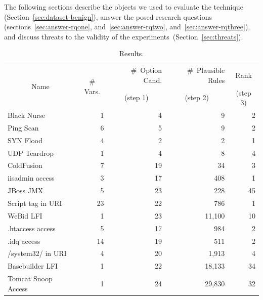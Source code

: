 \documentclass[sigconf,review, anonymous]{acmart}
\begin{document}
The following sections describe the objects we used to evaluate the
technique (Section~\ref{sec:dataset-benign}), answer the posed
research questions (sections~\ref{sec:answer-rqone},
and~\ref{sec:answer-rqtwo}, and~\ref{sec:answer-rqthree}), and
discuss threats to the validity of the
experiments~(Section~\ref{sec:threats}).

\renewcommand{\arraystretch}{0.9}
\setlength{\tabcolsep}{2pt}
\begin{table}[h!]
  \small
  \caption{\label{table:results}Results.}
  \vspace{-2ex}
  \centering
  \begin{tabular}{lrrrr}
    \toprule
    \multicolumn{1}{c}{\multirow{2}{*}{Name}} &
    \multicolumn{1}{c}{\multirow{2}{*}{\# Vars.}} &
    \#~Option Cand. &
    \#~Plausible Rules &    
    \multicolumn{1}{c}{Rank} \\

     &
    \multicolumn{1}{c}{} &
    \multicolumn{1}{c}{(step 1)} &
    \multicolumn{1}{c}{(step 2)} &    
    \multicolumn{1}{c}{(step 3)} \\

    \midrule
    Black Nurse & 1 & 4 & 9 & 2 \\    
    Ping Scan & 6 & 5 & 9 & 2 \\
    SYN Flood & 4 & 2 & 2 & 1 \\
    UDP Teardrop & 1 & 4 & 8 & 4 \\
    \midrule
    ColdFusion & 7 & 19 & 34 & 3\\
    iisadmin access & 3 & 17 & 408 & 1 \\        
    JBoss JMX & 5 & 23 & 228 & 45 \\
    Script tag in URI & 23 & 22 & 786 & 1 \\
    WeBid LFI & 1 & 23 & 11,100 & 10\\    
    .htaccess access & 5 & 17 & 984 & 2\\
    .idq access & 14 & 19 & 511 & 2 \\
    /system32/ in URI & 4 & 20 & 1,913 & 4 \\
    Basebuilder LFI & 1 & 22 & 18,133 & 34 \\
    Tomcat Snoop Access & 1 & 24 & 29,830 & 32 \\
    \bottomrule
  \end{tabular}
\end{table}
\end{document}
